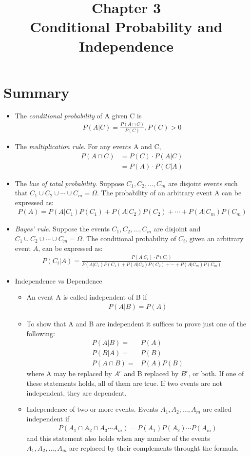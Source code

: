 \documentclass{article} %
\title{Chapter 3\\Conditional Probability and Independence}
\author{
}
\begin{document}
\maketitle

\section{Summary}

\begin{itemize}
\item The {\em conditional probability} of A given C is
\begin{align}
P(A|C) = \frac{P(A\cap C)}{P(C)}, P(C) >0
\end{align}
\item The {\em multiplication rule}. For any events A and C, 
\begin{align}
P(A \cap C) & = P(C) \cdot P(A|C) \\
& = P(A) \cdot P(C|A)
\end{align}
\item The {\em law of total probability}. Suppose $C_1, C_2, \ldots, C_m$ are disjoint events such that $C_1 \cup C_2 \cup \cdots \cup C_m = \Omega$. The probability of an arbitrary event A can be expressed as:
\begin{align}
P(A) = P(A|C_1)P(C_1)+P(A|C_2)P(C_2)+\cdots+P(A|C_m)P(C_m)
\end{align}
\item {\em Bayes' rule}. Suppose the events $C_1, C_2, \ldots, C_m$ are disjoint and $C_1 \cup C_2 \cup \cdots \cup C_m = \Omega$. The conditional probability of $C_i$, given an arbitrary event $A$, can be expressed as: 
\begin{align}
P(C_i|A) = \frac{P(A|C_i)\cdot P(C_i)}{P(A|C_1)P(C_1)+P(A|C_2)P(C_2)+\cdots +P(A|C_m)P(C_m)}
\end{align}
\item Independence vs Dependence 
\begin{itemize}
\item An event A is called independent of B if
\begin{align}
P(A|B) = P(A)
\end{align}
\item To show that A and B are independent it suffices to prove just one of the following:
\begin{align}
P(A|B) = & P(A) \\
P(B|A) = & P(B) \\
P(A\cap B) = & P(A)P(B)
\end{align}
where A may be replaced by $A^c$ and B replaced by $B^c$, or both. If one of these statements holds, all of them are true. If two events are not independent, they are dependent. 
\item Independence of two or more events. Events $A_1, A_2, \ldots, A_m$ are called independent if 
\begin{align}
P(A_1\cap A_2 \cap A_3 \cdots A_m) = P(A_1) P(A_2) \cdots P(A_m)
\end{align}
and this statement also holds when any number of the events $A_1, A_2, \ldots, A_m$ are replaced by their complements throught the formula.  
\end{itemize}
\end{itemize}
\end{document}
